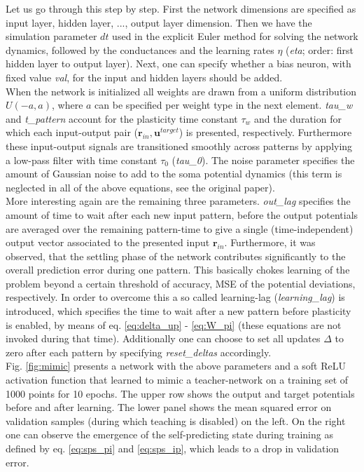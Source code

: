 \documentclass[12pt,a4paper]{article}
\begin{document}
Let us go through this step by step. First the network dimensions are specified as input layer, hidden layer, ..., output layer dimension. Then we have the simulation parameter $dt$ used in the explicit Euler method for solving the network dynamics, followed by the conductances and the learning rates $\eta$ (\textit{eta}; order: first hidden layer to output layer). Next, one can specify whether a bias neuron, with fixed value \textit{val}, for the input and hidden layers should be added.\\
When the network is initialized all weights are drawn from a uniform distribution $U(-a,a)$, where $a$ can be specified per weight type in the next element. \textit{tau\_w} and \textit{t\_pattern} account for the plasticity time constant $\tau_w$ and the duration for which each input-output pair ($\bm{r}_{in},\bm{u}^{target}$) is presented, respectively. Furthermore these input-output signals are transitioned smoothly across patterns by applying a low-pass filter with time constant $\tau_0$ (\textit{tau\_0}). The noise parameter specifies the amount of Gaussian noise to add to the soma potential dynamics (this term is neglected in all of the above equations, see the original paper).\\
More interesting again are the remaining three parameters. \textit{out\_lag} specifies the amount of time to wait after each new input pattern, before the output potentials are averaged over the remaining pattern-time to give a single (time-independent) output vector associated to the presented input $\bm{r}_{in}$. Furthermore, it was observed, that the settling phase of the network contributes significantly to the overall prediction error during one pattern. This basically chokes learning of the problem beyond a certain threshold of accuracy, MSE of the potential deviations, respectively. In order to overcome this a so called learning-lag (\textit{learning\_lag}) is introduced, which specifies the time to wait after a new pattern before plasticity is enabled, by means of eq. \eqref{eq:delta_up} - \eqref{eq:W_pi} (these equations are not invoked during that time). Additionally one can choose to set all updates $\Delta$ to zero after each pattern by specifying \textit{reset\_deltas} accordingly.\\

Fig. \ref{fig:mimic} presents a network with the above parameters and a soft ReLU activation function that learned to mimic a teacher-network on a training set of 1000 points for 10 epochs. The upper row shows the output and target potentials before and after learning. The lower panel shows the mean squared error on validation samples (during which teaching is disabled) on the left. On the right one can observe the emergence of the self-predicting state during training as defined by eq. \eqref{eq:sps_pi} and \eqref{eq:sps_ip}, which leads to a drop in validation error.
\end{document}
